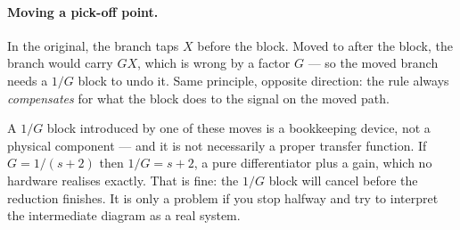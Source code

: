 \documentclass[11pt,a4paper]{article}
\begin{document}
\paragraph{Moving a pick-off point.} In the original, the branch taps $X$
before the block. Moved to after the block, the branch would carry $GX$, which
is wrong by a factor $G$ --- so the moved branch needs a $1/G$ block to undo
it. Same principle, opposite direction: the rule always \emph{compensates} for
what the block does to the signal on the moved path.

\begin{pitfall}
A $1/G$ block introduced by one of these moves is a bookkeeping device, not a
physical component --- and it is not necessarily a proper transfer function. If
$G=1/(s+2)$ then $1/G=s+2$, a pure differentiator plus a gain, which no
hardware realises exactly. That is fine: the $1/G$ block will cancel before
the reduction finishes. It is only a problem if you stop halfway and try to
interpret the intermediate diagram as a real system.
\end{pitfall}
\end{document}
